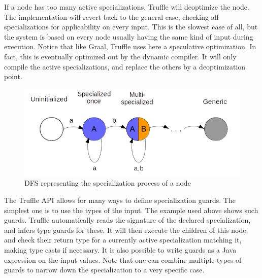 \documentclass[twoside,11pt,a4paper]{article}
\begin{document}
If a node has too many active specializations, Truffle will deoptimize the node. The implementation will revert back to the general case, checking all specializations for applicability on every input. This is the slowest case of all, but the system is based on every node usually having the same kind of input during execution. Notice that like Graal, Truffle uses here a speculative optimization. In fact, this is eventually optimized out by the dynamic compiler. It will only compile the active specializations, and replace the others by a deoptimization point.

\begin{figure}[th]
	\centering
	\includegraphics[width=12cm]{./graphs/SpecializationDFS.png}
	\caption{DFS representing the specialization process of a node}
	\label{fig:specdfs}
\end{figure}

The Truffle API allows for many ways to define specialization guards. The simplest one is to use the types of the input. The example used above shows such guards. Truffle automatically reads the signature of the declared specialization, and infers type guards for these. It will then execute the children of this node, and check their return type for a currently active specialization matching it, making type casts if necessary. It is also possible to write guards as a Java expression on the input values. Note that one can combine multiple types of guards to narrow down the specialization to a very specific case.
\end{document}
